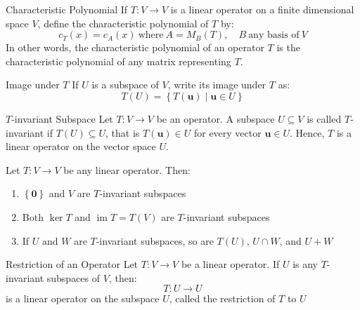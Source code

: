 \documentclass[12pt]{article}
\begin{document}
\begin{definition}{Characteristic Polynomial}{}
    If $ T : V \to V $ is a linear operator on a finite dimensional space $ V $, define the characteristic polynomial of $ T $ by:
    \[ c_T \left( x \right) = c_A \left( x \right) \ \text{where} \ A = M_B \left( T \right), \quad B \ \text{any basis of} \ V \]
    In other words, the characteristic polynomial of an operator $ T $ is the characteristic polynomial of any matrix representing $ T $.
\end{definition}

\begin{definition}{Image under $ T $}{}
    If $ U $ is a subspace of $ V $, write its image under $ T $ as:
    \[ T \left( U \right) = \left\{ T \left( \mathbf{u} \right) \mid \mathbf{u} \in U \right\} \]
\end{definition}

\begin{definition}{$ T $-invariant Subspace}{}
    Let $ T : V \to V $ be an operator. A subspace $ U \subseteq V $ is called $ T $-invariant if $ T \left( U \right) \subseteq U $, that is $ T \left( \mathbf{u} \right) \in U $ for every vector $ \mathbf{u} \in U $. Hence, $ T $ is a linear operator on the vector space $ U $.
\end{definition}

\begin{theorem}{}{}
    Let $ T : V \to V $ be any linear operator. Then:
    \begin{enumerate}[label=(\roman*)]
        \item $ \left\{ \mathbf{0} \right\} $ and $ V $ are $ T $-invariant subspaces
        \item Both $ \ker T $ and $ \operatorname{im} T = T \left( V \right) $ are $ T $-invariant subspaces
        \item If $ U $ and $ W $ are $ T $-invariant subspaces, so are $ T \left( U \right) $, $ U \cap W $, and $ U + W $
    \end{enumerate}
\end{theorem}

\begin{definition}{Restriction of an Operator}{}
    Let $ T : V \to V $ be a linear operator. If $ U $ is any $ T $-invariant subspaces of $ V $, then:
    \[ T : U \to U \]
    is a linear operator on the subspace $ U $, called the restriction of $ T $ to $ U $
\end{definition}
\end{document}
